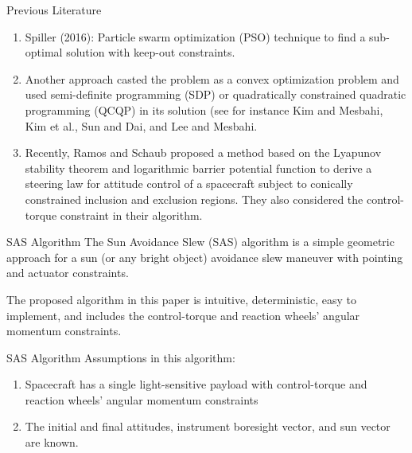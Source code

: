 \documentclass{beamer}
\begin{document}
\begin{frame}
		\begin{block}{Previous Literature}
			\begin{enumerate}
				\item Spiller (2016): Particle swarm optimization (PSO) technique to find a sub-optimal solution with keep-out constraints. 
				\item Another approach casted the problem as a convex optimization problem and used semi-definite programming (SDP) or quadratically constrained quadratic programming (QCQP) in its solution (see for instance Kim and Mesbahi, Kim et al., Sun and Dai, and Lee and Mesbahi.
				\item Recently, Ramos and Schaub proposed a method based on the Lyapunov stability theorem and logarithmic barrier potential function to derive a steering law for attitude control of a spacecraft subject to conically constrained inclusion and exclusion regions. They also considered the control-torque constraint in their algorithm.  
		\end{enumerate}
	\end{block}
\end{frame}
\begin{frame}
\begin{block}{SAS Algorithm}
	The Sun Avoidance Slew (SAS) algorithm is a simple geometric approach for a sun (or any bright object) avoidance slew maneuver with pointing and actuator constraints.
	
	\bigskip
	
	The proposed algorithm in this paper is intuitive, deterministic, easy to implement, and includes the control-torque and reaction wheels' angular momentum constraints. 

\end{block}
\end{frame}
\begin{frame}
\begin{block}{SAS Algorithm}	
	Assumptions in this algorithm: 
	\begin{enumerate} 
		\item Spacecraft has a single light-sensitive payload with control-torque and reaction wheels' angular momentum constraints
		\item The initial and final attitudes, instrument boresight vector, and sun vector are known. 
	\end{enumerate}
\end{block}
\end{frame}
\end{document}
